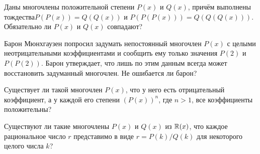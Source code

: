 \documentclass[a4paper,12pt]{article}
\begin{document}
Даны многочлены положительной степени $P(x)$ и $Q(x)$, причём выполнены тождества\break $P(P(x))=Q(Q(x))$ и
$P(P(P(x)))=Q(Q(Q(x)))$. Обязательно ли $P(x)$ и $Q(x)$ совпадают?



Барон Мюнхгаузен попросил задумать непостоянный многочлен $P(x)$ с целыми
неотрицательными коэффициентами и сообщить ему только значения $P(2)$ и $P(P(2))$.
Барон утверждает, что лишь по этим данным всегда может восстановить
задуманный многочлен. Не ошибается ли барон?

Существует ли такой многочлен $P(x)$, что у него есть отрицательный коэффициент, а у каждой его степени $(P(x))^n$, где $n>1$, все коэффициенты положительны?

Существуют ли такие многочлены $P(x)$ и $Q(x)$ из $\mathbb{R}(x)$, что каждое
рациональное число $r$ представимо в виде $r=P(k)/Q(k)$ для некоторого
целого числа $k$?



\end{document}
